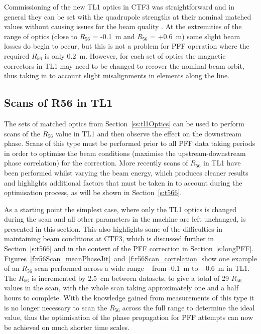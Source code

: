 Commissioning of the new TL1 optics in CTF3 was straightforward and in general they can be set with the quadrupole strengths at their nominal matched values without causing issues for the beam quality \cite{piotrPriv}. At the extremities of the range of optics (close to \(R_{56}\) = -0.1~m and \(R_{56}\) = +0.6~m) some slight beam losses do begin to occur, but this is not a problem for PFF operation where the required \(R_{56}\) is only 0.2~m. However, for each set of optics the magnetic correctors in TL1 may need to be changed to recover the nominal beam orbit, thus taking in to account slight misalignments in elements along the line.

\subsection{Scans of R56 in TL1}
\label{ss:r56Scans}

The sets of matched optics from Section~\ref{ss:tl1Optics} can be used to perform scans of the \(R_{56}\) value in TL1 and then observe the effect on the downstream phase. Scans of this type must be performed prior to all PFF data taking periods in order to optimise the beam conditions (maximise the upstream-downstream phase correlation) for the correction. More recently scans of \(R_{56}\) in TL1 have been performed whilst varying the beam energy, which produces cleaner results and highlights additional factors that must be taken in to account during the optimisation process, as will be shown in Section~\ref{s:t566}. 

As a starting point the simplest case, where only the TL1 optics is changed during the scan and all other parameters in the machine are left unchanged, is presented in this section. This also highlights some of the difficulties in maintaining beam conditions at CTF3, which is discussed further in Section~\ref{s:t566} and in the context of the PFF correction in Section~\ref{s:longPFF}. Figures~\ref{f:r56Scan_meanPhaseJit}~and~\ref{f:r56Scan_correlation} show one example of an \(R_{56}\) scan performed across a wide range -- from -0.1~m to +0.6~m in TL1. The \(R_{56}\) is incremented by 2.5~cm between datasets, to give a total of 29 \(R_{56}\) values in the scan, with the whole scan taking approximately one and a half hours to complete. With the knowledge gained from measurements of this type it is no longer necessary to scan the \(R_{56}\) across the full range to determine the ideal value, thus the optimisation of the phase propagation for PFF attempts can now be achieved on much shorter time scales.

